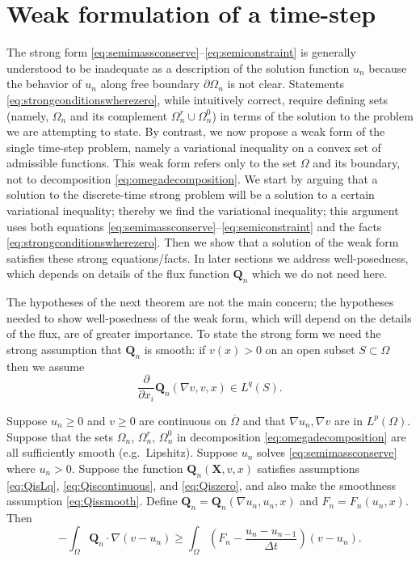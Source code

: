 \documentclass[final,leqno,onefignum,onetabnum]{siamltex1213bueler}
\newcommand\bQ{\mathbf{Q}}
\newcommand\bX{\mathbf{X}}
\renewcommand{\grad}{\nabla}
\begin{document}
\section{Weak formulation of a time-step}  \label{sec:weakform}

The strong form \eqref{eq:semimassconserve}--\eqref{eq:semiconstraint} is generally understood to be inadequate as a description of the solution function $u_n$ because the behavior of $u_n$ along free boundary $\partial\Omega_n$ is not clear.  Statements \eqref{eq:strongconditionswherezero}, while intuitively correct, require defining sets (namely, $\Omega_n$ and its complement $\Omega_n^r \cup \Omega_n^0$) in terms of the solution to the problem we are attempting to state.  By contrast, we now propose a weak form of the single time-step problem, namely a variational inequality \cite{Friedman,KinderlehrerStampacchia} on a convex set of admissible functions.  This weak form refers only to the set $\Omega$ and its boundary, not to decomposition \eqref{eq:omegadecomposition}.  We start by arguing that a solution to the discrete-time strong problem will be a solution to a certain variational inequality; thereby we find the variational inequality; this argument uses both equations  \eqref{eq:semimassconserve}--\eqref{eq:semiconstraint} and the facts \eqref{eq:strongconditionswherezero}.  Then we show that a solution of the weak form satisfies these strong equations/facts.  In later sections we address well-posedness, which depends on details of the flux function $\bQ_n$ which we do not need here.

The hypotheses of the next theorem are not the main concern; the hypotheses needed to show well-posedness of the weak form, which will depend on the details of the flux, are of greater importance.  To state the strong form we need the strong assumption that $\bQ_n$ is smooth: if $v(x)>0$ on an open subset $S\subset \Omega$ then we assume
\begin{equation}
\frac{\partial}{\partial x_i} \bQ_n(\grad v,v,x) \in L^q(S). \label{eq:Qissmooth}
\end{equation}

\medskip
\begin{theorem} \label{thm:strongimpliesweak} Suppose $u_n\ge 0$ and $v\ge 0$ are continuous on $\overline{\Omega}$ and that $\grad u_n,\grad v$ are in $L^p(\Omega)$.  Suppose that the sets $\Omega_n$, $\Omega_n^r$, $\Omega_n^0$ in decomposition \eqref{eq:omegadecomposition} are all sufficiently smooth (e.g.~Lipshitz).  Suppose $u_n$ solves \eqref{eq:semimassconserve} where $u_n>0$.  Suppose the function $\bQ_n(\bX,v,x)$ satisfies assumptions \eqref{eq:QisLq}, \eqref{eq:Qiscontinuous}, and \eqref{eq:Qiszero}, and also make the smoothness assumption \eqref{eq:Qissmooth}.  Define $\bQ_n=\bQ_n(\grad u_n,u_n,x)$ and $F_n = F_n(u_n,x)$.  Then
\begin{equation}
-\int_{\Omega} \bQ_n \cdot \grad(v-u_n) \ge \int_{\Omega} \left(F_n - \frac{u_n - u_{n-1}}{\Delta t}\right) (v-u_n). \label{eq:morallytheVI}
\end{equation}
\end{theorem}
\end{document}
